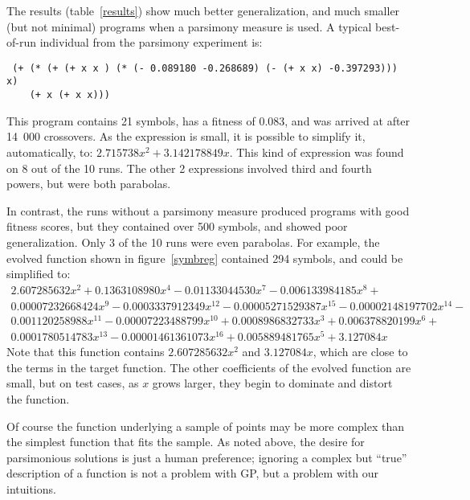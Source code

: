 The results (table~\ref{results}) show much better generalization, and much
smaller (but not minimal) programs when a parsimony measure is used.
A typical best-of-run individual from the parsimony experiment is:
\begin{verbatim}
 (+ (* (+ (+ x x ) (* (- 0.089180 -0.268689) (- (+ x x) -0.397293))) x)
    (+ x (+ x x)))
\end{verbatim}
This program contains 21 symbols, has a fitness of 0.083, and was arrived
at after 14~000 crossovers.  As the expression is small, it is possible to
simplify it, automatically, to: $2.715738x^2+3.142178849x$. This kind of
expression was found on 8 out of the 10 runs.  The other 2 expressions
involved third and fourth powers, but were both parabolas.

In contrast, the runs without a parsimony measure produced programs with
good fitness scores, but they contained over 500 symbols, and showed poor
generalization. Only 3 of the 10 runs were even parabolas. For example, the
evolved function shown in figure~\ref{symbreg} contained 294 symbols,
and could be simplified to:
\[\begin{array}{l}
2.607285632x^{2}+ 0.1363108980x^{4}- 0.01133044530x^{7}-
 0.006133984185x^{8}+\\ 0.00007232668424x^{9}- 0.0003337912349x^{12}-
 0.00005271529387x^{15}- 0.00002148197702x^{14}-\\ 0.001120258988x^{11}-
 0.00007223488799x^{10}+ 0.0008986832733x^{3}+ 0.006378820199x^{6}+\\
 0.0001780514783x^{13}- 0.00001461361073x^{16}+ 0.005889481765x^{5}+
 3.127084x
\end{array}\]
Note that this function contains $2.607285632x^{2}$ and $3.127084x$,
which are close to the terms in the target function. The other coefficients
of the evolved function are small, but on test cases, as $x$ grows larger,
they begin to dominate and distort the function.

Of course the function underlying a sample of points may be more complex
than the simplest function that fits the sample.  As noted above, the
desire for parsimonious solutions is just a human preference; ignoring a
complex but ``true'' description of a function is not a problem with GP,
but a problem with our intuitions.


